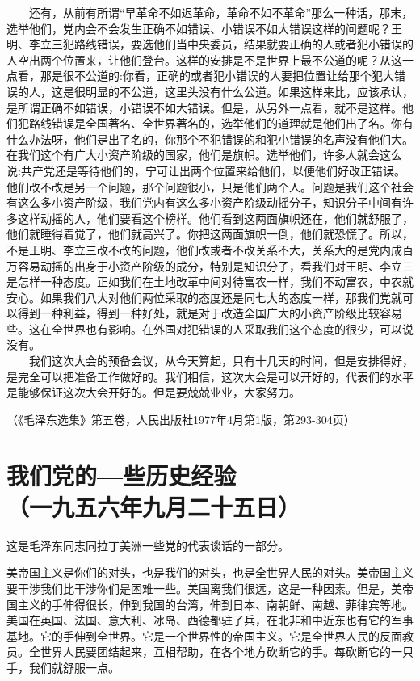 \documentclass[cn,11pt,chinese]{elegantbook}
\def\myformat#1{\hfil\hfil #1}
\begin{document}
　　还有，从前有所谓“早革命不如迟革命，革命不如不革命”那么一种话，那末，选举他们，党内会不会发生正确不如错误、小错误不如大错误这样的问题呢？王明、李立三犯路线错误，要选他们当中央委员，结果就要正确的人或者犯小错误的人空出两个位置来，让他们登台。这样的安排是不是世界上最不公道的呢？从这一点看，那是很不公道的:你看，正确的或者犯小错误的人要把位置让给那个犯大错误的人，这是很明显的不公道，这里头没有什么公道。如果这样来比，应该承认，是所谓正确不如错误，小错误不如大错误。但是，从另外一点看，就不是这样。他们犯路线错误是全国著名、全世界著名的，选举他们的道理就是他们出了名。你有什么办法呀，他们是出了名的，你那个不犯错误的和犯小错误的名声没有他们大。在我们这个有广大小资产阶级的国家，他们是旗帜。选举他们，许多人就会这么说:共产党还是等待他们的，宁可让出两个位置来给他们，以便他们好改正错误。他们改不改是另一个问题，那个问题很小，只是他们两个人。问题是我们这个社会有这么多小资产阶级，我们党内有这么多小资产阶级动摇分子，知识分子中间有许多这样动摇的人，他们要看这个榜样。他们看到这两面旗帜还在，他们就舒服了，他们就睡得着觉了，他们就高兴了。你把这两面旗帜一倒，他们就恐慌了。所以，不是王明、李立三改不改的问题，他们改或者不改关系不大，关系大的是党内成百万容易动摇的出身于小资产阶级的成分，特别是知识分子，看我们对王明、李立三是怎样一种态度。正如我们在土地改革中间对待富农一样，我们不动富农，中农就安心。如果我们八大对他们两位采取的态度还是同七大的态度一样，那我们党就可以得到一种利益，得到一种好处，就是对于改造全国广大的小资产阶级比较容易些。这在全世界也有影响。在外国对犯错误的人采取我们这个态度的很少，可以说没有。\\
　　我们这次大会的预备会议，从今天算起，只有十几天的时间，但是安排得好，是完全可以把准备工作做好的。我们相信，这次大会是可以开好的，代表们的水平是能够保证这次大会开好的。但是要兢兢业业，大家努力。\\
\begin{flushright}（《毛泽东选集》第五卷，人民出版社1977年4月第1版，第293-304页）\end{flushright}
\newpage\section*{\myformat{我们党的—些历史经验}\\\myformat{（一九五六年九月二十五日）}}
\begin{introduction}\item  这是毛泽东同志同拉丁美洲一些党的代表谈话的一部分。\end{introduction}
美帝国主义是你们的对头，也是我们的对头，也是全世界人民的对头。美帝国主义要干涉我们比干涉你们是困难一些。美国离我们很远，这是一种因素。但是，美帝国主义的手伸得很长，伸到我国的台湾，伸到日本、南朝鲜、南越、菲律宾等地。美国在英国、法国、意大利、冰岛、西德都驻了兵，在北非和中近东也有它的军事基地。它的手伸到全世界。它是一个世界性的帝国主义。它是全世界人民的反面教员。全世界人民要团结起来，互相帮助，在各个地方砍断它的手。每砍断它的一只手，我们就舒服一点。\\
\end{document}
